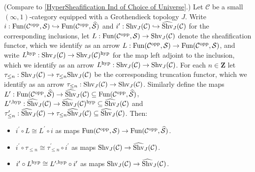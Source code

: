 \documentclass[10pt]{article}
\newcommand{\mS}{\mathcal S}
\newcommand{\C}{\mathcal C}
\newcommand{\ZZ}{\mathbb{Z}}
\def\ZZ{{\mathbf Z}}
\theoremstyle{witharg}
\theoremstyle{witharg}
\theoremstyle{witharg2}
\begin{document}
\begin{proposition}{}\label{HyperSheafification Ind of Choice of Universe Intro}

    (Compare to \ref{HyperSheafification Ind of Choice of Universe}.) Let $\C$ be a small $(\infty,1)$-category equipped with a Grothendieck topology $J$. Write $i:\textnormal{Fun}(\C^{\textnormal{opp}},\mS)\hookrightarrow \textnormal{Fun}(\C^{\textnormal{opp}},\widehat{\mS})$ and  $i^\prime:\textnormal{Shv}_J(\C)\hookrightarrow \widehat{\textnormal{Shv}}_J(\C)$ for the corresponding inclusions, let $L:\textnormal{Fun}(\C^{\textnormal{opp}},\mS)\rightarrow \textnormal{Shv}_J(\C)$ denote the sheafification functor, which we identify as an arrow $L:\textnormal{Fun}(\C^{\textnormal{opp}},\mS)\rightarrow \textnormal{Fun}(\C^{\textnormal{opp}},\mS)$, and write $L^{\textnormal{hyp}}:\textnormal{Shv}_J(\C)\rightarrow \textnormal{Shv}_J(\C)^{\textnormal{hyp}}$ for the map left adjoint to the inclusion, which we identify as an arrow $L^{\textnormal{hyp}}:\textnormal{Shv}_J(\C)\rightarrow \textnormal{Shv}_J(\C)$. For each $n\in \ZZ$ let $\tau_{\leq n}:\textnormal{Shv}_J(\C)\rightarrow\tau_{\leq n}\textnormal{Shv}_J(\C)$ be the corresponding truncation functor, which we identify as an arrow $\tau_{\leq n}:\textnormal{Shv}_J(\C)\rightarrow \textnormal{Shv}_J(\C)$. Similarly define the maps $L^\prime:\textnormal{Fun}(\C^{\textnormal{opp}},\widehat{\mS})\rightarrow \widehat{\textnormal{Shv}}_J(\C)\subseteq \textnormal{Fun}(\C^{\textnormal{opp}},\widehat{\mS})$, $L^{\prime,\textnormal{hyp}}:\widehat{\textnormal{Shv}}_J(\C)\rightarrow\widehat{\textnormal{Shv}}_J(\C)^\textnormal{hyp}\subseteq \widehat{\textnormal{Shv}}_J(\C)$ and $\tau^\prime_{\leq n}:\widehat{\textnormal{Shv}}_J(\C)\rightarrow \tau_{\leq n}\widehat{\textnormal{Shv}}_J(\C)\subseteq \widehat{\textnormal{Shv}}_J(\C)$. Then: 

    \begin{itemize}
    
        \item [$(1)$] $i^\prime \circ L\cong L^\prime\circ i$ as maps $\textnormal{Fun}(\C^{\textnormal{opp}},\mS)\rightarrow \textnormal{Fun}(\C^{\textnormal{opp}},\widehat{\mS})$.

        \item [$(2)$] $i^\prime\circ \tau_{\leq n} \cong \tau^\prime_{\leq n}\circ i^\prime$ as maps $\textnormal{Shv}_J(\C)\rightarrow \widehat{\textnormal{Shv}}_J(\C)$. 

        \item [$(3)$] $i^\prime\circ L^{\textnormal{hyp}}\cong L^{\prime,\textnormal{hyp}}\circ i^\prime$ as maps $\textnormal{Shv}_J(\C)\rightarrow\widehat{\textnormal{Shv}}_J(\C)$.
        
    \end{itemize}
    
\end{proposition}
\end{document}
